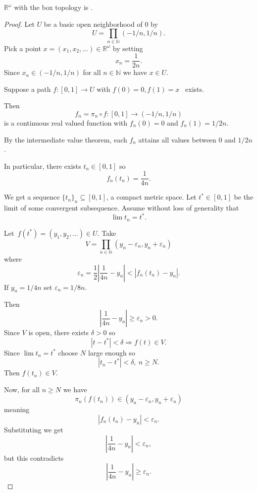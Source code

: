 \documentclass[11pt]{article}
\begin{document}
\begin{prop}\label{prop:box_locally_path_connected}
    $\mathbb R^\omega$ with the box topology 
    is . 
\end{prop}
\begin{proof}
    Let $U$ be a basic open neighborhood of $0$ 
    by 
    \[
        U = \prod_{n\in\mathbb N}(-1/n, 1/n). 
    \]
    Pick a point $x = (x_1,x_2,\ldots) \in \mathbb R^\omega$ 
    by setting 
    \[
        x_n = \frac{1}{2n}. 
    \]
    Since $x_n \in (-1/n, 1/n)$ for all $n \in \mathbb N$ 
    we have $x \in U$. 

    Suppose a path $f : [0,1] \to U$ with $f(0) = 0, f(1) = x$ 
    exists. 

    Then 
    \[
        f_n = \pi_n \circ f : [0,1] \to (-1/n, 1/n)
    \]
    is a continuous real valued function with 
    $f_n(0) = 0$ and $f_n(1) = 1/2n$. 

    By the intermediate value theorem, each 
    $f_n$ attains all values between $0$ and $1/2n$. 

    In particular, there exists $t_n \in [0,1]$ so 
    \[
        f_n(t_n) = \frac{1}{4n}. 
    \]

    We get a sequence $\{t_n\}_n \subseteq [0,1]$, 
    a compact metric space. Let $t^* \in [0,1]$ be the limit of 
    some convergent subsequence. Assume without loss 
    of generality that 
    \[
        \lim t_n = t^*.
    \]

    Let $f(t^*) = (y_1,y_2,\ldots) \in U$. 
    Take 
    \[
        V = \prod_{n\in\mathbb N} (y_n - \varepsilon_n, 
        y_n + \varepsilon_n)
    \]
    where 
    \[
        \varepsilon_n = \frac{1}{2}\left|
            \frac{1}{4n} - y_n
        \right| < |f_n(t_n) - y_n|. 
    \]
    If $y_n = 1/4n$ set $\varepsilon_n = 1/8n$.

    Then 
    \[
        \left|\frac{1}{4n} - y_n\right| \geq \varepsilon_n > 0.
    \]
    Since $V$ is open, there exists $\delta > 0$ so 
    \[
        |t-t^*| < \delta \Rightarrow f(t) \in V. 
    \]
    Since $\lim t_n = t^*$ choose $N$ large enough so 
    \[
        |t_n - t^*| < \delta, \ n \geq N. 
    \]
    Then $f(t_n) \in V$.

    Now, for all $n \geq N$ we have 
    \[
        \pi_n(f(t_n)) \in (y_n - \varepsilon_n, y_n 
        + \varepsilon_n)
    \]
    meaning 
    \[
        |f_n(t_n) - y_n| < \varepsilon_n. 
    \]
    Substituting we get 
    \[
        \left|\frac{1}{4n} - y_n\right| < \varepsilon_n, 
    \]
    but this contradicts 
    \[
        \left|\frac{1}{4n} - y_n\right| \geq \varepsilon_n.
    \]
\end{proof}
\end{document}
